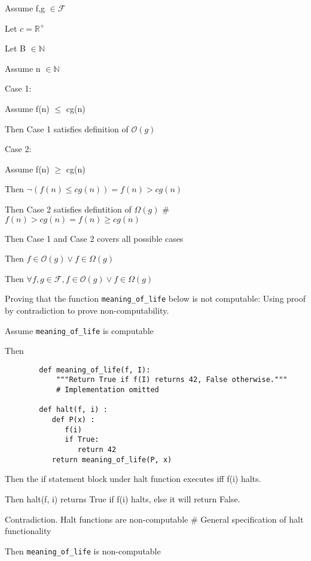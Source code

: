 \documentclass{article}
\begin{document}
\begin{enumerate}
\begin{description}
	\item Assume f,g $\in \mathcal{F}$
	\item Let $c = \mathbb{R}^+$
	\item Let B $\in \mathbb{N}$
	\item Assume n $\in \mathbb {N}$
	\begin{description}
		\item Case 1:
			\begin{description}
			\item Assume f(n) $\leq$ cg(n)
			\item Then Case 1 satisfies definition of $\mathcal{O}(g)$
			\end{description}
		\item Case 2:
		\item Then Case 1 and Case 2 covers all possible cases
	\end{description}
	\item Then $f\in\mathcal{O}(g) \vee f\in\Omega(g)$
	\item Then $\forall f, g\in\mathcal{F}, f\in\mathcal{O}(g) \vee f\in\Omega(g)$
\end {description}

\item Proving that the function \verb+meaning_of_life+ below is not computable:   %
Using proof by contradiction to prove non-computability. 
\begin{description}
	\item Assume  \verb+meaning_of_life+ is computable 
	\begin{description}
		\item Then 
		\begin{verbatim}
		def meaning_of_life(f, I):
		 	"""Return True if f(I) returns 42, False otherwise."""
			# Implementation omitted

		def halt(f, i) :
		   def P(x) :
		      f(i)
		      if True:
		         return 42
		   return meaning_of_life(P, x)
		\end{verbatim}
		\item Then the if statement block under halt function executes iff f(i) halts.
		\item Then halt(f, i) returns True if f(i) halts, else it will return False. 
		\item Contradiction. Halt functions are non-computable  \# General specification of halt functionality
	\end{description}
	\item Then  \verb+meaning_of_life+ is non-computable 


\end {description}
\end{enumerate}
\end{document}
